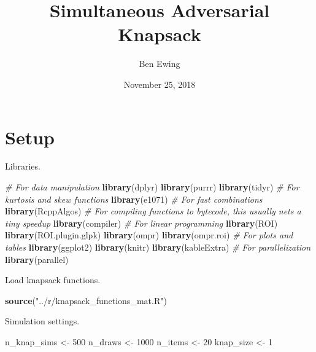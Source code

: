 \documentclass[]{article}
\title{Simultaneous Adversarial Knapsack}
\author{Ben Ewing}
\date{November 25, 2018}
\newenvironment{Shaded}{\begin{snugshade}}{\end{snugshade}}
\newcommand{\KeywordTok}[1]{\textcolor[rgb]{0.13,0.29,0.53}{\textbf{#1}}}
\newcommand{\DecValTok}[1]{\textcolor[rgb]{0.00,0.00,0.81}{#1}}
\newcommand{\StringTok}[1]{\textcolor[rgb]{0.31,0.60,0.02}{#1}}
\newcommand{\CommentTok}[1]{\textcolor[rgb]{0.56,0.35,0.01}{\textit{#1}}}
\newcommand{\NormalTok}[1]{#1}
\begin{document}
\maketitle

\section{Setup}\label{setup}

Libraries.

\begin{Shaded}
\begin{Highlighting}[]
\CommentTok{# For data manipulation}
\KeywordTok{library}\NormalTok{(dplyr)}
\KeywordTok{library}\NormalTok{(purrr)}
\KeywordTok{library}\NormalTok{(tidyr)}
\CommentTok{# For kurtosis and skew functions}
\KeywordTok{library}\NormalTok{(e1071)}
\CommentTok{# For fast combinations}
\KeywordTok{library}\NormalTok{(RcppAlgos)}
\CommentTok{# For compiling functions to bytecode, this usually nets a tiny speedup}
\KeywordTok{library}\NormalTok{(compiler)}
\CommentTok{# For linear programming}
\KeywordTok{library}\NormalTok{(ROI)}
\KeywordTok{library}\NormalTok{(ROI.plugin.glpk)}
\KeywordTok{library}\NormalTok{(ompr)}
\KeywordTok{library}\NormalTok{(ompr.roi)}
\CommentTok{# For plots and tables}
\KeywordTok{library}\NormalTok{(ggplot2)}
\KeywordTok{library}\NormalTok{(knitr)}
\KeywordTok{library}\NormalTok{(kableExtra)}
\CommentTok{# For parallelization}
\KeywordTok{library}\NormalTok{(parallel)}
\end{Highlighting}
\end{Shaded}

Load knapsack functions.

\begin{Shaded}
\begin{Highlighting}[]
\KeywordTok{source}\NormalTok{(}\StringTok{"../r/knapsack_functions_mat.R"}\NormalTok{)}
\end{Highlighting}
\end{Shaded}

Simulation settings.

\begin{Shaded}
\begin{Highlighting}[]
\NormalTok{n_knap_sims <-}\StringTok{ }\DecValTok{500}
\NormalTok{n_draws <-}\StringTok{ }\DecValTok{1000}
\NormalTok{n_items <-}\StringTok{ }\DecValTok{20}
\NormalTok{knap_size <-}\StringTok{ }\DecValTok{1}
\end{Highlighting}
\end{Shaded}
\end{document}
